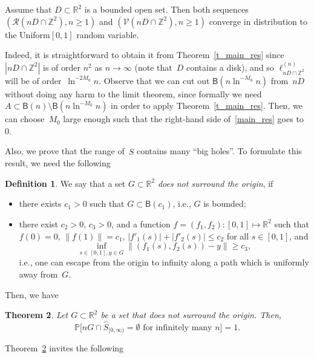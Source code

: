 \documentclass[10pt]{amsart}
\newtheorem{theo}{Theorem}[section]
\theoremstyle{definition}\newtheorem{defi}[theo]{Definition}\newtheorem{rema}[theo]{Remark}\newtheorem{exam}[theo]{Example}\newtheorem{exem}[theo]{Example}\newtheorem{nota}[theo]{Notation}
\newcommand{\1}[1]{{\mathbf 1}{\{#1\}}}
\newcommand{\Z}{\mathbb{Z}}
\newcommand{\V}{{\mathcal V}}
\newcommand{\RR}{{\mathcal R}}
\newcommand{\R}{{\mathbb R}}
\newcommand{\s}{{\widehat S}}
\newcommand{\8}{{\infty}}
\newcommand{\IP}{{\mathbb P}}
\newcommand{\B}{{\mathsf B}}
\begin{document}
\begin{coro}\label{cor_open}
Assume that $D\subset \R^2$ is a bounded open set. Then both sequences $(\RR(nD\cap\Z^2),n\geq 1)$ and $(\V(nD\cap\Z^2),n\geq 1)$ converge in distribution to the Uniform$[0,1]$ random variable.
\end{coro}

Indeed, it is straightforward to obtain it from Theorem~\ref{t_main_res} since $|nD\cap\Z^2|$ is of order $n^2$ as $n\to\infty$ (note that~$D$ contains a disk), and so $\ell^{(n)}_{nD\cap\Z^2}$ will be of order~$\ln^{-2M_0}n$. Observe that we can cut out $\B(n\ln^{-M_0}n)$ from~$nD$ without doing any harm to the limit theorem, since formally we need $A\subset \B(n)\setminus \B(n\ln^{-M_0}n)$ in order to apply Theorem~\ref{t_main_res}. Then, we can choose~$M_0$ large enough such that the right-hand side of~\eqref{main_res} goes to~$0$.

Also, we prove that the range of~$\s$ contains many ``big holes''. To formulate this result, we need the following

\begin{defi}\label{df_surround}
We say that a set $G\subset \R^2$ \emph{does not surround the origin}, if
\begin{itemize}
\item there exists $c_1>0$ such that $G\subset\B(c_1)$, i.e., $G$ is bounded;
\item there exist $c_2>0$, $c_3>0$, and a function $f=(f_1,f_2): [0,1]\mapsto \R^2$ such that $f(0)=0$, $\|f(1)\|= c_1$, $|f'_1(s)|+|f'_2(s)|\leq c_2$ for all $s\in [0,1]$, and
\[
\inf_{s\in[0,1], y\in G} \|(f_1(s),f_2(s))-y\|\geq c_3,
\]
i.e., one can escape from the origin to infinity along a path which is uniformly away from~$G$.
\end{itemize}
\end{defi}

Then, we have


\begin{theo}\label{t_bigholes}
Let $G\subset \R^2$ be a set that does not surround the origin. Then,
\begin{equation}\label{eq_bigholes}
\IP\big[nG\cap \s_{[0,\infty)} = \emptyset
\text{ for infinitely many }n\big] = 1.
\end{equation}
\end{theo}


Theorem~\ref{t_bigholes} invites the following
\end{document}
